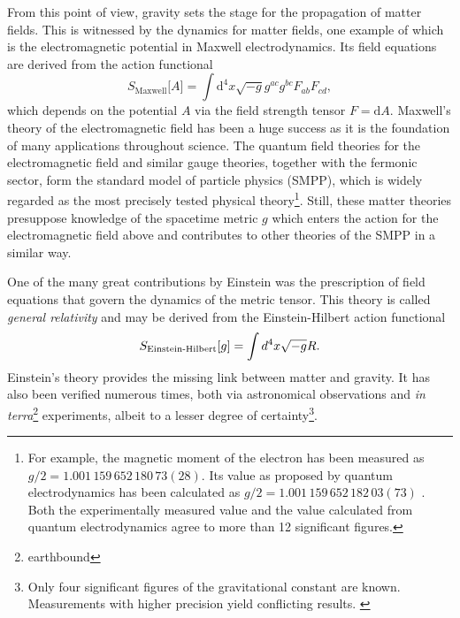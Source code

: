 From this point of view, gravity sets the stage for the propagation of matter fields. This is witnessed by the dynamics for matter fields, one example of which is the electromagnetic potential in Maxwell electrodynamics. Its field equations are derived from the action functional
\begin{equation*}
  S_\text{Maxwell}\lbrack A\rbrack = \int\mathrm d^4x \sqrt{-g} g^{ac} g^{bc} F_{ab} F_{cd},
\end{equation*}
which depends on the potential $A$ via the field strength tensor $F = \mathrm dA$. Maxwell's theory of the electromagnetic field has been a huge success as it is the foundation of many applications throughout science. The quantum field theories for the electromagnetic field and similar gauge theories, together with the fermonic sector, form the standard model of particle physics (SMPP), which is widely regarded as the most precisely tested physical theory\footnote{For example, the magnetic moment of the electron has been measured as $g/2 = 1.001\,159\,652\,180\,73(28)$. \cite{http://dx.doi.org/10.1103/PhysRevA.83.052122} Its value as proposed by quantum electrodynamics has been calculated as $g/2 = 1.001\,159\,652\,182\,03(73)$ \cite{https://doi.org/10.1103/PhysRevD.96.019901}. Both the experimentally measured value and the value calculated from quantum electrodynamics agree to more than 12 significant figures.}. Still, these matter theories presuppose knowledge of the spacetime metric $g$ which enters the action for the electromagnetic field above and contributes to other theories of the SMPP in a similar way.

One of the many great contributions by Einstein was the prescription of field equations that govern the dynamics of the metric tensor. \cite{einstein_gr} This theory is called \emph{general relativity} and may be derived from the Einstein-Hilbert action functional
\begin{equation*}
  S_\text{Einstein-Hilbert}\lbrack g\rbrack = \int\mathrm \mathrm d^4x \sqrt{-g} R.
\end{equation*}
Einstein's theory provides the missing link between matter and gravity. It has also been verified numerous times, both via astronomical observations and \emph{in terra}\footnote{earthbound} experiments, albeit to a lesser degree of certainty\footnote{Only four significant figures of the gravitational constant are known. \cite{https://doi.org/10.1103/FRevModPhys.88.035009} Measurements with higher precision yield conflicting results. \cite{https://doi.org/10.1103/RevModPhys.84.1527}}.


